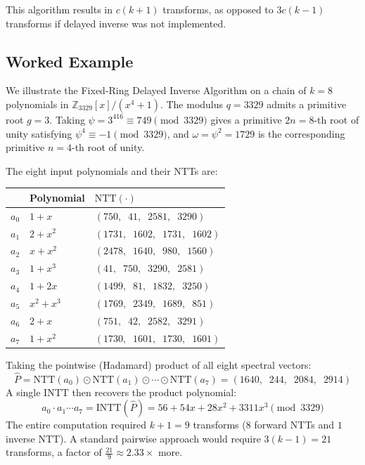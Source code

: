 \documentclass[runningheads]{llncs}
\begin{document}
This algorithm results in $c(k+1)$ transforms, as opposed to $3c(k-1)$ transforms if delayed inverse was not implemented.

\subsection{Worked Example}

\begin{example}
We illustrate the Fixed-Ring Delayed Inverse Algorithm on a chain of $k = 8$ polynomials in $\mathbb{Z}_{3329}[x]/(x^4+1)$.  The modulus $q = 3329$ admits a primitive root $g = 3$. Taking $\psi = 3^{416} \equiv 749 \pmod{3329}$ gives a primitive $2n = 8$-th root of unity satisfying $\psi^4 \equiv -1 \pmod{3329}$, and $\omega = \psi^2 = 1729$ is the corresponding primitive $n = 4$-th root of unity.

The eight input polynomials and their NTTs are:


\begin{center}
\small
\begin{tabular}{c l l}
\hline
& Polynomial & $\mathrm{NTT}(\cdot)$ \\
\hline
$a_0$ & $1 + x$ & $(750,\;\; 41,\;\; 2581,\;\; 3290)$ \\
$a_1$ & $2 + x^2$ & $(1731,\;\; 1602,\;\; 1731,\;\; 1602)$ \\
$a_2$ & $x + x^2$ & $(2478,\;\; 1640,\;\; 980,\;\; 1560)$ \\
$a_3$ & $1 + x^3$ & $(41,\;\; 750,\;\; 3290,\;\; 2581)$ \\
$a_4$ & $1 + 2x$ & $(1499,\;\; 81,\;\; 1832,\;\; 3250)$ \\
$a_5$ & $x^2 + x^3$ & $(1769,\;\; 2349,\;\; 1689,\;\; 851)$ \\
$a_6$ & $2 + x$ & $(751,\;\; 42,\;\; 2582,\;\; 3291)$ \\
$a_7$ & $1 + x^2$ & $(1730,\;\; 1601,\;\; 1730,\;\; 1601)$ \\
\hline
\end{tabular}
\end{center}


Taking the pointwise (Hadamard) product of all eight spectral vectors:
$$\hat{P} = \mathrm{NTT}(a_0) \odot \mathrm{NTT}(a_1) \odot \cdots \odot \mathrm{NTT}(a_7) = (1640,\;\; 244,\;\; 2084,\;\; 2914)$$
A single INTT then recovers the product polynomial:
$$a_0 \cdot a_1 \cdots a_7 = \mathrm{INTT}(\hat{P}) = 56 + 54x + 28x^2 + 3311x^3 \pmod{3329}$$
The entire computation required $k + 1 = 9$ transforms ($8$ forward NTTs and $1$ inverse NTT).  A standard pairwise approach would require $3(k-1) = 21$ transforms, a factor of $\frac{21}{9} \approx 2.33\times$ more.
\end{example}
\end{document}
